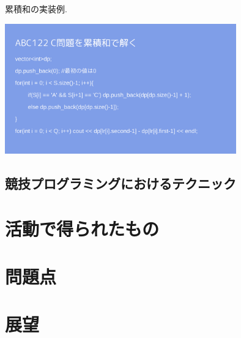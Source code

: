 \documentclass[11pt,a4paper]{jsarticle}
\begin{document}
累積和の実装例.

\includegraphics[width=10cm]{ruisekiwa.png}

\subsection{競技プログラミングにおけるテクニック}
\section{活動で得られたもの}
\section{問題点}
\section{展望}

%
%
\end{document}
